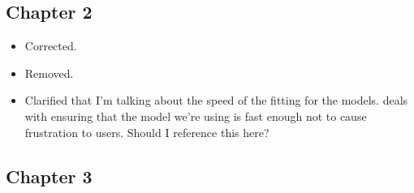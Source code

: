 \subsection{Chapter 2}
\begin{itemize}
\item {} Corrected.
\item {} Removed.
\item {} Clarified that I'm talking about the speed of the fitting for the models.  deals with ensuring that the model we're using is fast enough not to cause frustration to users. Should I reference this here?
\end{itemize}

\subsection{Chapter 3}
